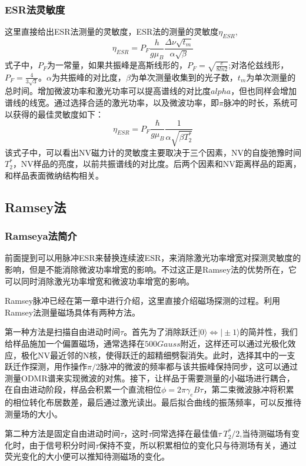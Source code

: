\subsubsection{ESR法灵敏度}
这里直接给出ESR法测量的灵敏度，ESR法的测量的灵敏度$\eta_{ESR}$,
\begin{equation}
    \eta_{ESR}=P_F\frac{h}{g \mu_{B}}\frac{\Delta \nu \sqrt{t_m}}{\alpha \sqrt{\beta}}
\end{equation}
式子中，$P_F$为一常量，如果共振峰是高斯线形的，$P_F=\sqrt{\frac{e}{8 ln2}}$;对洛伦兹线形，$P_F=\frac{4}{3\sqrt{3}}$。$\alpha$为共振峰的对比度，$\beta$为单次测量收集到的光子数，$t_m$为单次测量的总时间。增加微波功率和激光功率可以提高谱线的对比度$alpha$，但也同样会增加谱线的线宽。通过选择合适的激光功率，以及微波功率，即$\pi$脉冲的时长，系统可以获得的最佳灵敏度如下：
\begin{equation}
    \eta_{ESR}=P_F\frac{\hbar}{g \mu_{B}}\frac{1}{\alpha \sqrt{\beta T_2^*}}
\end{equation}
该式子中，可以看出NV磁力计的灵敏度主要取决于三个因素，NV的自旋弛豫时间$T_2^*$，NV样品的亮度，以前共振谱线的对比度。后两个因素和NV距离样品的距离，和样品表面微纳结构相关。
\subsection{Ramsey法}
\subsubsection{Ramseya法简介}
前面提到可以用脉冲ESR来替换连续波ESR，来消除激光功率增宽对探测灵敏度的影响，但是不能消除微波功率增宽的影响。不过这正是Ramsey法的优势所在，它可以同时消除激光功率增宽和微波功率增宽的影响。

Ramsey脉冲已经在第一章中进行介绍，这里直接介绍磁场探测的过程。利用Ramsey法测量磁场具体有两种方法。

第一种方法是扫描自由进动时间$\tau$。首先为了消除跃迁$|0\rangle\Longleftrightarrow|\pm{1}\rangle$的简并性，我们给样品施加一个偏置磁场，通常选择在$500 \si{Gauss}$附近，这样还可以通过光极化效应，极化NV最近邻的N核，使得跃迁的超精细劈裂消失。此时，选择其中的一支跃迁作探测，用作操作$\pi/2$脉冲的微波的频率都与该共振峰保持同步，这可以通过测量ODMR谱来实现微波的对焦。接下，让样品于需要测量的小磁场进行耦合，在自由进动阶段，样品会积累一个直流相位$\phi=2 \pi \gamma_{e} B \tau$，第二束微波脉冲将积累的相位转化布居数差，最后通过激光读出。最后拟合曲线的振荡频率，可以反推待测量场的大小。

第二种方法是固定自由进动时间$\tau$，这时$\tau$同常选择在最佳值$\tau~T_2^*/2$,当待测磁场有变化时，由于信号积分时间$\tau$保持不变，所以积累相位的变化只与待测场有关，通过荧光变化的大小便可以推知待测磁场的变化。
